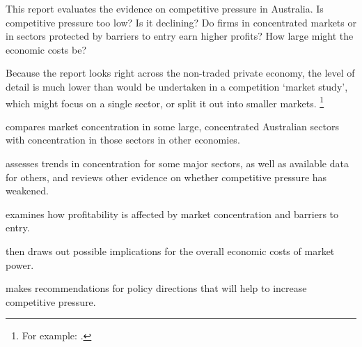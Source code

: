 This report evaluates the evidence on competitive pressure in Australia. Is competitive pressure too low? Is it declining? Do firms in concentrated markets or in sectors protected by barriers to entry earn higher profits? How large might the economic costs be? 

Because the report looks right across the non-traded private economy, the level of detail is much lower than would be undertaken in a competition `market study', which might focus on a single sector, or split it out into smaller markets.%
\footnote{For example: \textcites{ACCCCommsMarketStudyDraft2017}{ACCCNewCarMarketStudyDraft2017}.}

 compares market concentration in some large, concentrated Australian sectors with concentration in those sectors in other economies.


 assesses trends in concentration for some major sectors, as well as available data for others, and reviews other evidence on whether competitive pressure has weakened.

 examines how profitability is affected by market concentration and barriers to entry.%


 then draws out possible implications for the overall economic costs of market power.

 makes recommendations for policy directions that will help to increase competitive pressure. 
